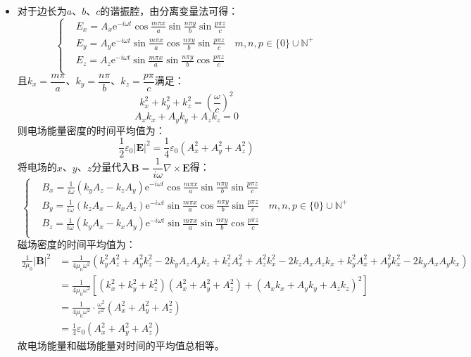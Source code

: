 \documentclass[a4paper,fontset=none]{ctexart}
\begin{document}
\begin{itemize}
    \item[15.]
    对于边长为$a$、$b$、$c$的谐振腔，由分离变量法可得：
    \[
        \left\{
        \begin{aligned}
            & E_x = A_x\mathrm{e}^{-i\omega t}\cos\frac{m\pi x}{a}\sin\frac{n\pi y}{b}\sin\frac{p\pi z}{c} \\
            & E_y = A_y\mathrm{e}^{-i\omega t}\sin\frac{m\pi x}{a}\cos\frac{n\pi y}{b}\sin\frac{p\pi z}{c}\quad m,n,p\in\{0\}\cup\mathbb{N}^+ \\
            & E_z = A_z\mathrm{e}^{-i\omega t}\sin\frac{m\pi x}{a}\sin\frac{n\pi y}{b}\cos\frac{p\pi z}{c} \\
        \end{aligned}
        \right.
    \]
    且$k_x=\dfrac{m\pi}{a}$、$k_y=\dfrac{n\pi}{b}$、$k_z=\dfrac{p\pi}{c}$满足：
    \[
        k_x^2 + k_y^2 + k_z^2 = \left(\frac{\omega}{c}\right)^2
    \]
    \[
        A_x k_x+A_y k_y + A_z k_z = 0
    \]
    则电场能量密度的时间平均值为：
    \[
        \frac{1}{2}\varepsilon_0|\bm{E}|^2 = \frac{1}{4}\varepsilon_0(A_x^2 + A_y^2 + A_z^2)
    \]
    将电场的$x$、$y$、$z$分量代入$\bm{B}=\dfrac{1}{i\omega}\nabla\times\bm{E}$得：
    \[
        \left\{
        \begin{aligned}
            & B_x = \frac{1}{i\omega}(k_y A_z - k_z A_y)\mathrm{e}^{-i\omega t}\cos\frac{m\pi x}{a}\sin\frac{n\pi y}{b}\sin\frac{p\pi z}{c} \\
            & B_y = \frac{1}{i\omega}(k_z A_x - k_x A_z)\mathrm{e}^{-i\omega t}\sin\frac{m\pi x}{a}\cos\frac{n\pi y}{b}\sin\frac{p\pi z}{c}\quad m,n,p\in\{0\}\cup\mathbb{N}^+ \\
            & B_z = \frac{1}{i\omega}(k_y A_x - k_x A_y)\mathrm{e}^{-i\omega t}\sin\frac{m\pi x}{a}\sin\frac{n\pi y}{b}\cos\frac{p\pi z}{c} \\
        \end{aligned}
        \right.
    \]
    磁场密度的时间平均值为：
    \begin{align*}
        \frac{1}{2\mu_0}|\bm{B}|^2
        &= \frac{1}{4\mu_0\omega^2}(k_y^2A_z^2+A_y^2k_z^2-2k_y A_z A_y k_z+k_z^2A_x^2+A_z^2k_x^2-2k_z A_x A_z k_x+k_y^2A_x^2+A_y^2k_x^2-2k_y A_x A_y k_x) \\
        &= \frac{1}{4\mu_0\omega^2}[(k_x^2+k_y^2+k_z^2)(A_x^2+A_y^2+A_z^2) + (A_x k_x+A_y k_y + A_z k_z)^2] \\
        &= \frac{1}{4\mu_0\omega^2} \cdot \frac{\omega^2}{c^2}(A_x^2+A_y^2+A_z^2) \\
        &= \frac{1}{4}\varepsilon_0(A_x^2+A_y^2+A_z^2)
    \end{align*}
    故电场能量和磁场能量对时间的平均值总相等。

    \end{itemize}
\end{document}
